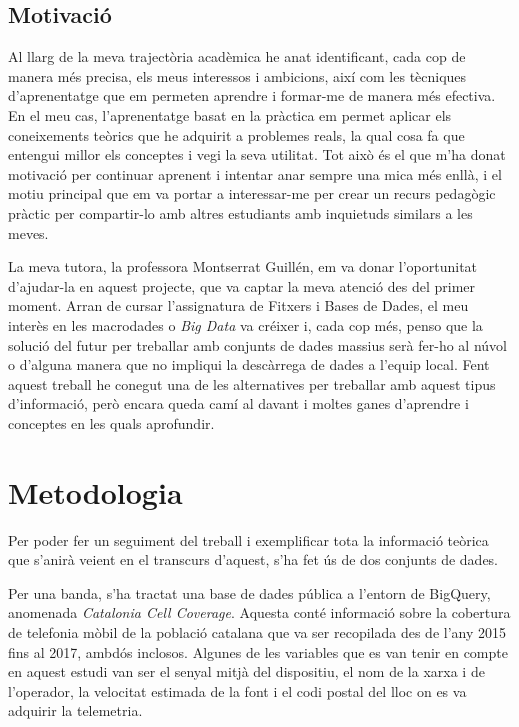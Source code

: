 \documentclass[12pt,longbibliography]{article}
\theoremstyle{definition}
\theoremstyle{remark}
\begin{document}
\subsection{Motivació}

Al llarg de la meva trajectòria acadèmica he anat identificant, cada cop de manera més precisa, els meus interessos i ambicions, així com les tècniques d'aprenentatge que em permeten aprendre i formar-me de manera més efectiva. En el meu cas, l'aprenentatge basat en la pràctica em permet aplicar els coneixements teòrics que he adquirit a problemes reals, la qual cosa fa que entengui millor els conceptes i vegi la seva utilitat. Tot això és el que m’ha donat motivació per continuar aprenent i intentar anar sempre una mica més enllà, i el motiu principal que em va portar a interessar-me per crear un recurs pedagògic pràctic per compartir-lo amb altres estudiants amb inquietuds similars a les meves.

La meva tutora, la professora Montserrat Guillén, em va donar l'oportunitat d'ajudar-la en aquest projecte, que va captar la meva atenció des del primer moment. Arran de cursar l'assignatura de Fitxers i Bases de Dades, el meu interès en les macrodades o \textit{Big Data} va créixer i, cada cop més, penso que la solució del futur per treballar amb conjunts de dades massius serà fer-ho al núvol o d'alguna manera que no impliqui la descàrrega de dades a l'equip local. Fent aquest treball he conegut una de les alternatives per treballar amb aquest tipus d'informació, però encara queda camí al davant i moltes ganes d'aprendre i conceptes en les quals aprofundir.

\pagebreak

\section{Metodologia}

Per poder fer un seguiment del treball i exemplificar tota la informació teòrica que s'anirà veient en el transcurs d'aquest, s'ha fet ús de dos conjunts de dades. 

Per una banda, s'ha tractat una base de dades pública a l'entorn de BigQuery, anomenada \textit{Catalonia Cell Coverage}. Aquesta conté informació sobre la cobertura de telefonia mòbil de la població catalana que va ser recopilada des de l'any 2015 fins al 2017, ambdós inclosos. Algunes de les variables que es van tenir en compte en aquest estudi van ser el senyal mitjà del dispositiu, el nom de la xarxa i de l'operador, la velocitat estimada de la font i el codi postal del lloc on es va adquirir la telemetria.
\end{document}
